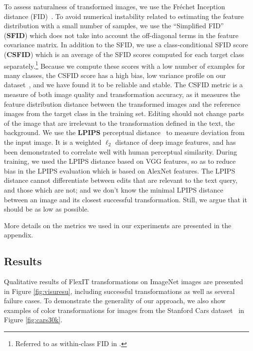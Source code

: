 To assess naturalness of  transformed images, we use the Fréchet Inception distance
 (FID)~\cite{heusel2017gans}.
To avoid numerical instability related to estimating the feature distribution with a 
small number of samples, we use the ``Simplified FID'' (\textbf{SFID}) 
\cite{kim2020simplified} which does not take into account the off-diagonal terms in 
the feature covariance matrix. In addition to the SFID, we use a class-conditional
 SFID score  (\textbf{CSFID}) which is an average of the SFID scores computed for each 
 target class separately.\footnote{Referred to as within-class FID in
  \cite{benny21ijcv}.} Because we compute these scores with a low number of examples 
  for many classes, the CSFID score has a high bias, low variance profile on our
   dataset~\cite{chong2020effectively}, and we  
 have found it to be reliable and stable.
The CSFID metric is a measure of both image quality and transformation accuracy, as it 
measures the feature distribution distance between the transformed images and the 
reference images from the target class in the %
training set. 
Editing should not change parts of the image that are irrelevant to the transformation
 defined in the text,  \eg the background.  
We use the \textbf{LPIPS} perceptual distance~\cite{zhang18cvpr}  to measure deviation 
from the input image.
It is a weighted $\ell_2$ distance of deep image features, and has been demonstrated
 to correlate well with human perceptual similarity. 
During training, we used the LPIPS distance based on  VGG features, so as to reduce
 bias in the LPIPS evaluation which is based on AlexNet features. 
The LPIPS  distance cannot differentiate between edits that are relevant to the text 
query, and those which are not; and we don't know the minimal LPIPS distance between 
an image and its closest successful transformation. Still, we argue that it should be 
as low as possible.

More details on the metrics we used in our experiments are presented in the appendix.



\subsection{Results}


Qualitative results of FlexIT transformations on ImageNet images are presented in 
Figure \ref{fig:visuresu}, including successful transformations as well as several
 failure cases. 
To demonstrate the generality of our approach, we also  show examples of color 
transformations for images from the Stanford Cars 
dataset~\cite{KrauseStarkDengFei-Fei_3DRR2013} in Figure \ref{fig:cars30k}.

